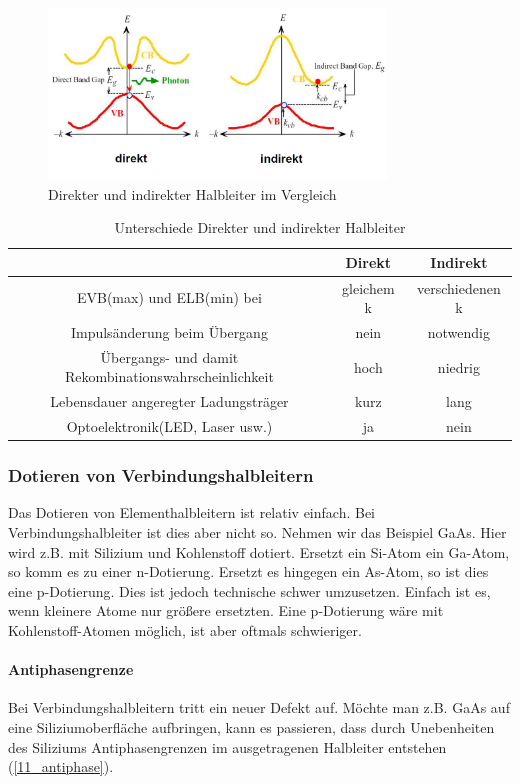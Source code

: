 	\begin{figure}[h]
		\centering
		\includegraphics[width=0.8\textwidth]{Kapitel/Kap11/direkte_indirekte_halbleiter.PNG}
		\caption{Direkter und indirekter Halbleiter im Vergleich}
		\label{11_vergleich}
	\end{figure}

	\begin{table}[h]
		\centering
		\begin{tabular}{c|c|c}
			&Direkt & Indirekt \\
			\hline
			EVB(max) und ELB(min) bei & gleichem k & verschiedenen k \\
			Impulsänderung beim Übergang & nein & notwendig \\
			Übergangs- und damit Rekombinationswahrscheinlichkeit & hoch & niedrig \\
			Lebensdauer angeregter Ladungsträger & kurz & lang\\
			Optoelektronik(LED, Laser usw.) & ja & nein\\
		\end{tabular}
		\caption{Unterschiede Direkter und indirekter Halbleiter}
		\label{11_unterschiede}
	\end{table}
	
	\subsubsection{Dotieren von Verbindungshalbleitern}	
	Das Dotieren von Elementhalbleitern ist relativ einfach. Bei Verbindungshalbleiter ist dies aber nicht so. Nehmen wir das Beispiel GaAs. Hier wird z.B. mit Silizium und Kohlenstoff dotiert. Ersetzt ein Si-Atom ein Ga-Atom, so komm es zu einer n-Dotierung. Ersetzt es hingegen ein As-Atom, so ist dies eine p-Dotierung. Dies ist jedoch technische schwer umzusetzen. Einfach ist es, wenn kleinere Atome nur größere ersetzten. Eine p-Dotierung wäre mit Kohlenstoff-Atomen möglich, ist aber oftmals schwieriger.
	
	\paragraph{Antiphasengrenze} Bei Verbindungshalbleitern tritt ein neuer Defekt auf. Möchte man z.B. GaAs auf eine Siliziumoberfläche aufbringen, kann es passieren, dass durch Unebenheiten des Siliziums Antiphasengrenzen im ausgetragenen Halbleiter entstehen (\ref{11_antiphase}).
	
